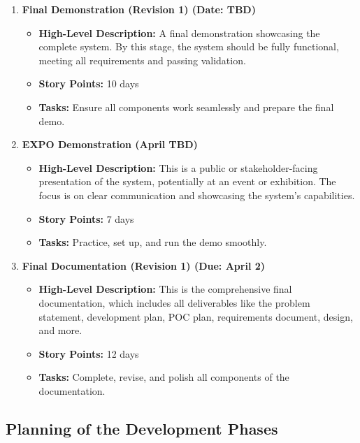 \documentclass[12pt]{article}
\begin{document}
\begin{enumerate}
    \item \textbf{Final Demonstration (Revision 1) (Date: TBD)}
    \begin{itemize}
        \item \textbf{High-Level Description:} A final demonstration showcasing the complete system. By this stage, the system should be fully functional, meeting all requirements and passing validation.
        \item \textbf{Story Points:} 10 days
        \item \textbf{Tasks:} Ensure all components work seamlessly and prepare the final demo.
    \end{itemize}

    \item \textbf{EXPO Demonstration (April TBD)}
    \begin{itemize}
        \item \textbf{High-Level Description:} This is a public or stakeholder-facing presentation of the system, potentially at an event or exhibition. The focus is on clear communication and showcasing the system’s capabilities.
        \item \textbf{Story Points:} 7 days
        \item \textbf{Tasks:} Practice, set up, and run the demo smoothly.
    \end{itemize}

    \item \textbf{Final Documentation (Revision 1) (Due: April 2)}
    \begin{itemize}
        \item \textbf{High-Level Description:} This is the comprehensive final documentation, which includes all deliverables like the problem statement, development plan, POC plan, requirements document, design, and more.
        \item \textbf{Story Points:} 12 days
        \item \textbf{Tasks:} Complete, revise, and polish all components of the documentation.
    \end{itemize}

\end{enumerate}
\subsection{Planning of the Development Phases}
\end{document}
